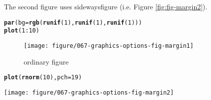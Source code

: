 \documentclass{article}\usepackage[]{graphicx}\usepackage[]{color}
\makeatletter
\newcommand{\hlnum}[1]{\textcolor[rgb]{0.686,0.059,0.569}{#1}}%
\newcommand{\hlopt}[1]{\textcolor[rgb]{0,0,0}{#1}}%
\newcommand{\hlstd}[1]{\textcolor[rgb]{0.345,0.345,0.345}{#1}}%
\newcommand{\hlkwc}[1]{\textcolor[rgb]{0.333,0.667,0.333}{#1}}%
\newcommand{\hlkwd}[1]{\textcolor[rgb]{0.737,0.353,0.396}{\textbf{#1}}}%
\newenvironment{kframe}{%
 \def\at@end@of@kframe{}%
 \ifinner\ifhmode%
  \def\at@end@of@kframe{\end{minipage}}%
  \begin{minipage}{\columnwidth}%
 \fi\fi%
 \def\FrameCommand##1{\hskip\@totalleftmargin \hskip-\fboxsep
 \colorbox{shadecolor}{##1}\hskip-\fboxsep
     \hskip-\linewidth \hskip-\@totalleftmargin \hskip\columnwidth}%
 \MakeFramed {\advance\hsize-\width
   \@totalleftmargin\z@ \linewidth\hsize
   \@setminipage}}%
 {\par\unskip\endMakeFramed%
 \at@end@of@kframe}
\newenvironment{knitrout}{}{} %
\makeatother
\begin{document}
The second figure uses sidewaysfigure (i.e. Figure \ref{fig:fig-margin2}).

\begin{knitrout}
\color{fgcolor}\begin{kframe}
\begin{alltt}
\hlkwd{par}\hlstd{(}\hlkwc{bg} \hlstd{=} \hlkwd{rgb}\hlstd{(}\hlkwd{runif}\hlstd{(}\hlnum{1}\hlstd{),} \hlkwd{runif}\hlstd{(}\hlnum{1}\hlstd{),} \hlkwd{runif}\hlstd{(}\hlnum{1}\hlstd{)))}
\hlkwd{plot}\hlstd{(}\hlnum{1}\hlopt{:}\hlnum{10}\hlstd{)}
\end{alltt}
\end{kframe}\begin{figure}[H]

\texttt{[image: figure/067-graphics-options-fig-margin1]} \caption[ordinary figure]{ordinary figure\label{fig:fig-margin1}}
\end{figure}

\begin{kframe}\begin{alltt}
\hlkwd{plot}\hlstd{(}\hlkwd{rnorm}\hlstd{(}\hlnum{10}\hlstd{),} \hlkwc{pch} \hlstd{=} \hlnum{19}\hlstd{)}
\end{alltt}
\end{kframe}\begin{sidewaysfigure}[H]

\texttt{[image: figure/067-graphics-options-fig-margin2]} \caption[sideways figure]{sideways figure\label{fig:fig-margin2}}
\end{sidewaysfigure}


\end{knitrout}
\end{document}
